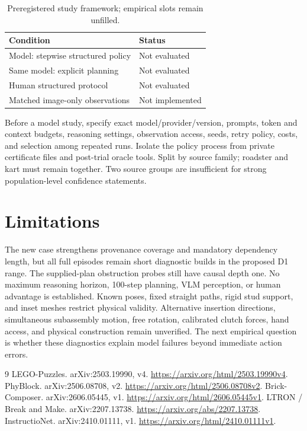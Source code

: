 \documentclass[10pt,twocolumn]{article}
\begin{document}
\begin{table}[t]
\centering\small
\caption{Preregistered study framework; empirical slots remain unfilled.}
\begin{tabular}{ll}\toprule
Condition & Status\\\midrule
Model: stepwise structured policy & Not evaluated\\
Same model: explicit planning & Not evaluated\\
Human structured protocol & Not evaluated\\
Matched image-only observations & Not implemented\\\bottomrule
\end{tabular}
\end{table}

Before a model study, specify exact model/provider/version, prompts, token and
context budgets, reasoning settings, observation access, seeds, retry policy,
costs, and selection among repeated runs. Isolate the policy process from
private certificate files and post-trial oracle tools. Split by source family;
roadster and kart must remain together. Two source groups are insufficient for
strong population-level confidence statements.

\section{Limitations}
The new case strengthens provenance coverage and mandatory dependency length,
but all full episodes remain short diagnostic builds in the proposed D1 range.
The supplied-plan obstruction probes still have causal depth one. No maximum
reasoning horizon, 100-step planning, VLM perception, or human advantage is
established. Known poses, fixed straight paths, rigid stud support, and inset
meshes restrict physical validity. Alternative insertion directions, simultaneous
subassembly motion, free rotation, calibrated clutch forces, hand access, and
physical construction remain unverified. The next empirical question is whether
these diagnostics explain model failures beyond immediate action errors.

\begin{thebibliography}{9}\small
{} LEGO-Puzzles. arXiv:2503.19990, v4.
\url{https://arxiv.org/html/2503.19990v4}.
 PhyBlock. arXiv:2506.08708, v2.
\url{https://arxiv.org/html/2506.08708v2}.
 Brick-Composer. arXiv:2606.05445, v1.
\url{https://arxiv.org/html/2606.05445v1}.
 LTRON / Break and Make. arXiv:2207.13738.
\url{https://arxiv.org/abs/2207.13738}.
 InstructioNet. arXiv:2410.01111, v1.
\url{https://arxiv.org/html/2410.01111v1}.
\end{thebibliography}
\end{document}
